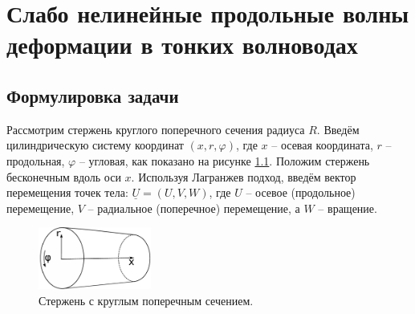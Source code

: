 \documentclass[12pt, a4paper]{report}
\newcommand{\vect}[1]{\underline{#1}}
\begin{document}
\chapter{Слабо нелинейные продольные волны деформации в тонких волноводах}

\section{Формулировка задачи}


Рассмотрим стержень круглого поперечного сечения радиуса $R$. Введём цилиндрическую систему координат $(x, r, \varphi)$, где $x$ -- осевая координата, $r$ -- продольная, $\varphi$ -- угловая, как показано на рисунке \ref{fig:rod}. Положим стержень бесконечным вдоль оси $x$. Используя Лагранжев подход, введём вектор перемещения точек тела: $\vect{U} = (U, V, W)$, где $U$ -- осевое (продольное) перемещение, $V$ -- радиальное (поперечное) перемещение, а $W$ -- вращение.
\begin{figure}[h]
	\centering
	\includegraphics[width=0.33\textwidth]{Fig1}
	\caption{Стержень с круглым поперечным сечением.}
	\label{fig:rod}
\end{figure}
\end{document}
